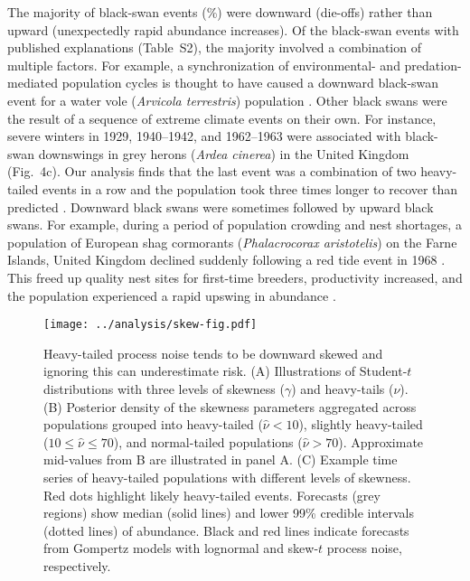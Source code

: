 \documentclass[9pt,twocolumn,twoside]{pnas-new}
\begin{document}
The majority of black-swan events (\percBSDown \%) were downward (die-offs)
rather than upward (unexpectedly rapid abundance increases). Of the black-swan
events with published explanations (Table~S2), the majority involved
a combination of multiple factors. For example, a synchronization of
environmental- and predation-mediated population cycles is thought to have
caused a downward black-swan event for a water vole (\emph{Arvicola
terrestris}) population \cite{saucy1994}. Other black swans were the result of
a sequence of extreme climate events on their own. For instance, severe winters
in 1929, 1940--1942, and 1962--1963 were associated with black-swan downswings
in grey herons (\emph{Ardea cinerea}) in the United
Kingdom \cite{stafford1971} (Fig.~4c). Our analysis finds that the last event
was a combination of two heavy-tailed events in a row and the population took
three times longer to recover than predicted \cite{stafford1971}. Downward black
swans were sometimes followed by upward black swans. For example, during
a period of population crowding and nest shortages, a population of European
shag cormorants (\emph{Phalacrocorax aristotelis}) on the Farne Islands, United
Kingdom declined suddenly following a red tide event in 1968 \cite{potts1980}.
This freed up quality nest sites for first-time breeders, productivity
increased, and the population experienced a rapid upswing in
abundance \cite{potts1980}.

\begin{figure}[htb]
\centering
\texttt{[image: ../analysis/skew-fig.pdf]}
\caption{Heavy-tailed process noise tends to be downward skewed and
ignoring this can underestimate risk. (A) Illustrations of Student-$t$
distributions with three levels of skewness (\(\gamma\)) and heavy-tails (\(\nu\)).
(B) Posterior density of the skewness parameters aggregated across
populations grouped into heavy-tailed (\(\hat{\nu} < 10\)), slightly
heavy-tailed (\(10 \leq \hat{\nu} \leq 70\)), and normal-tailed populations
(\(\hat{\nu} > 70\)). Approximate mid-values from B are illustrated in
panel A. (C) Example time series of heavy-tailed populations with
different levels of skewness. Red dots highlight likely heavy-tailed events.
Forecasts (grey regions) show median (solid lines) and lower 99\% credible
intervals (dotted lines) of abundance. Black and red lines indicate forecasts
from Gompertz models with lognormal and skew-$t$ process noise, respectively.
}
\label{fig:4}
\end{figure}
\end{document}
